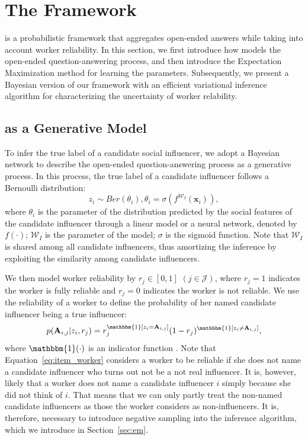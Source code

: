 \section{The \sys Framework}

\sys is a probabilistic framework that aggregates open-ended answers while taking into account worker reliability. In this section, we first introduce how \sys models the open-ended question-answering process, and then introduce the Expectation Maximization method for learning the parameters. Subsequently, we present a Bayesian version of our framework with an efficient variational inference algorithm for characterizing the uncertainty of worker relability. 

\subsection{\sys as a Generative Model}
To infer the true label of a candidate social influencer, we adopt a Bayesian network to describe the open-ended question-answering process as a generative process. In this process, the true label of a candidate influencer follows a Bernoulli distribution:
%
\begin{equation}
    z_i \sim Ber(\theta_i), \theta_i  = \sigma (f^{\mathcal{W}_I}(\mathbf{x}_i)),
    \label{eq:dis_item}
\end{equation}
%
where $\theta_i$ is the parameter of the distribution predicted by the social features of the candidate influencer through a linear model or a neural network, denoted by $f(\cdot)$; $\mathcal{W}_I$ is the parameter of the model; $\sigma$ is the sigmoid function. Note that $\mathcal{W}_I$ is shared among all candidate influencers, thus amortizing the inference \cite{gershman2014amortized} by exploiting the similarity among candidate influencers. 


We then model worker reliability by $r_j \in [0,1]$ $(j\in \mathcal{J})$, where $r_j=1$ indicates the worker is fully reliable and $r_j=0$ indicates the worker is not reliable. We use the reliability of a worker to define the probability of her named candidate influencer being a true influencer:
%
\begin{equation}
    p(\mathbf{A}_{i,j} | z_i,  r_j) = r_j^{\mathbbm{1}[z_i=\mathbf{A}_{i,j}]} (1- r_j)^{\mathbbm{1}[z_i\ne \mathbf{A}_{i,j}]},
    \label{eq:item_worker}
\end{equation}
%
where $\mathbbm{1}(\cdot)$ is an indicator function . Note that Equation~\ref{eq:item_worker} considers a worker to be reliable if she does not name a candidate influencer who turns out not be a not real influencer. It is, however, likely that a worker does not name a candidate influencer $i$ simply because she did not think of $i$. That means that we can only partly treat the non-named candidate influencers as those the worker considers as non-influencers. It is, therefore, necessary to introduce negative sampling into the inference algorithm, which we introduce in Section~\ref{sec:em}. 

